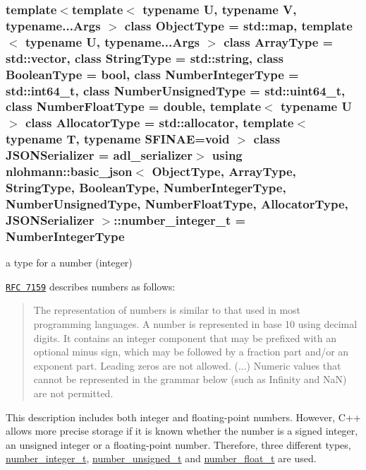 \subsubsection[{\texorpdfstring{number\+\_\+integer\+\_\+t}{number_integer_t}}]{\setlength{\rightskip}{0pt plus 5cm}template$<$template$<$ typename U, typename V, typename...\+Args $>$ class Object\+Type = std\+::map, template$<$ typename U, typename...\+Args $>$ class Array\+Type = std\+::vector, class String\+Type  = std\+::string, class Boolean\+Type  = bool, class Number\+Integer\+Type  = std\+::int64\+\_\+t, class Number\+Unsigned\+Type  = std\+::uint64\+\_\+t, class Number\+Float\+Type  = double, template$<$ typename U $>$ class Allocator\+Type = std\+::allocator, template$<$ typename T, typename S\+F\+I\+N\+A\+E=void $>$ class J\+S\+O\+N\+Serializer = adl\+\_\+serializer$>$ using {\bf nlohmann\+::basic\+\_\+json}$<$ Object\+Type, Array\+Type, String\+Type, Boolean\+Type, Number\+Integer\+Type, Number\+Unsigned\+Type, Number\+Float\+Type, Allocator\+Type, J\+S\+O\+N\+Serializer $>$\+::{\bf number\+\_\+integer\+\_\+t} =  Number\+Integer\+Type}\hypertarget{classnlohmann_1_1basic__json_a98e611d67b7bd75307de99c9358ab2dc}{}\label{classnlohmann_1_1basic__json_a98e611d67b7bd75307de99c9358ab2dc}


a type for a number (integer) 

\href{http://rfc7159.net/rfc7159}{\tt R\+FC 7159} describes numbers as follows\+: \begin{quote}
The representation of numbers is similar to that used in most programming languages. A number is represented in base 10 using decimal digits. It contains an integer component that may be prefixed with an optional minus sign, which may be followed by a fraction part and/or an exponent part. Leading zeros are not allowed. (...) Numeric values that cannot be represented in the grammar below (such as Infinity and NaN) are not permitted. \end{quote}


This description includes both integer and floating-\/point numbers. However, C++ allows more precise storage if it is known whether the number is a signed integer, an unsigned integer or a floating-\/point number. Therefore, three different types, \hyperlink{classnlohmann_1_1basic__json_a98e611d67b7bd75307de99c9358ab2dc}{number\+\_\+integer\+\_\+t}, \hyperlink{classnlohmann_1_1basic__json_ab906e29b5d83ac162e823ada2156b989}{number\+\_\+unsigned\+\_\+t} and \hyperlink{classnlohmann_1_1basic__json_a88d6103cb3620410b35200ee8e313d97}{number\+\_\+float\+\_\+t} are used.

